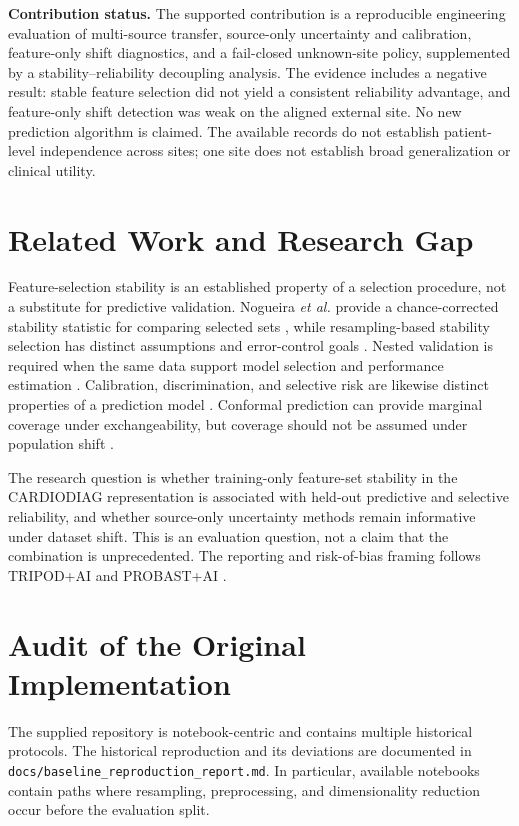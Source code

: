 \documentclass[journal]{IEEEtran}
\begin{document}
\textbf{Contribution status.} The supported contribution is a reproducible
engineering evaluation of multi-source transfer, source-only uncertainty and
calibration, feature-only shift diagnostics, and a fail-closed unknown-site
policy, supplemented by a stability--reliability decoupling analysis. The
evidence includes a negative result: stable feature selection did not yield a
consistent reliability advantage, and feature-only shift detection was weak on
  the aligned external site. No new prediction algorithm is claimed. The available
  records do not establish patient-level independence across sites; one site does
  not establish broad generalization or clinical utility.

\section{Related Work and Research Gap}
Feature-selection stability is an established property of a selection procedure,
not a substitute for predictive validation. Nogueira \emph{et al.} provide a
chance-corrected stability statistic for comparing selected sets
\cite{nogueira2018stability}, while resampling-based stability selection has
distinct assumptions and error-control goals \cite{meinshausen2010stability}.
Nested validation is required when the same data support model selection and
performance estimation \cite{varma2006bias,cawley2010overfitting}. Calibration,
discrimination, and selective risk are likewise distinct properties of a
prediction model \cite{vancalster2019calibration}. Conformal prediction can
provide marginal coverage under exchangeability, but coverage should not be
assumed under population shift \cite{angelopoulos2023conformal}.

The research question is whether training-only feature-set stability in the
CARDIODIAG representation is associated with held-out predictive and selective
reliability, and whether source-only uncertainty methods remain informative
under dataset shift. This is an evaluation question, not a claim that the
combination is unprecedented. The reporting and risk-of-bias framing follows
TRIPOD+AI and PROBAST+AI
\cite{collins2024tripodai,moons2025probastai}.

\section{Audit of the Original Implementation}
The supplied repository is notebook-centric and contains multiple historical
protocols. The historical reproduction and its deviations are documented in
\texttt{docs/baseline\_reproduction\_report.md}. In particular, available
notebooks contain paths where resampling, preprocessing, and dimensionality
reduction occur before the evaluation split.
\end{document}
